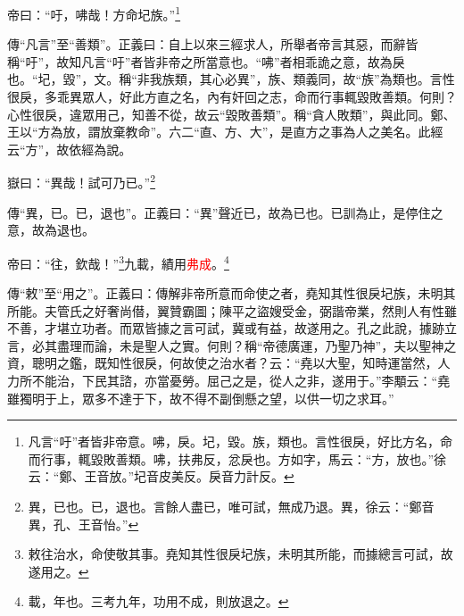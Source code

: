 帝曰：“吁，咈哉！方命圮族。”\footnote{凡言“吁”者皆非帝意。咈，戾。圮，毀。族，類也。言性很戾，好比方名，命而行事，輒毀敗善類。咈，扶弗反，忿戾也。方如字，馬云：“方，放也。”徐云：“鄭、王音放。”圮音皮美反。戾音力計反。}

{\noindent\zhuan{}\fzbyks 傳“凡言”至“善類”。正義曰：自上以來三經求人，所舉者帝言其惡，而辭皆稱“吁”，故知凡言“吁”者皆非帝之所當意也。“咈”者相乖詭之意，故為戾也。“圮，毀”，文。稱“非我族類，其心必異”，族、類義同，故“族”為類也。言性很戾，多乖異眾人，好此方直之名，內有奸回之志，命而行事輒毀敗善類。何則？心性很戾，違眾用己，知善不從，故云“毀敗善類”。稱“貪人敗類”，與此同。鄭、王以“方為放，謂放棄教命”。六二“直、方、大”，是直方之事為人之美名。此經云“方”，故依經為說。 \par}

嶽曰：“異哉！試可乃已。”\footnote{異，已也。已，退也。言餘人盡已，唯可試，無成乃退。異，徐云：“鄭音異，孔、王音怡。”}

{\noindent\zhuan{}\fzbyks 傳“異，已。已，退也”。正義曰：“異”聲近已，故為已也。已訓為止，是停住之意，故為退也。 \par}

帝曰：“往，欽哉！”\footnote{敕往治水，命使敬其事。堯知其性很戾圮族，未明其所能，而據總言可試，故遂用之。}九載，績用\textcolor{red}{弗成}。\footnote{載，年也。三考九年，功用不成，則放退之。}

{\noindent\zhuan{}\fzbyks 傳“敕”至“用之”。正義曰：傳解非帝所意而命使之者，堯知其性很戾圮族，未明其所能。夫管氏之好奢尚僣，翼贊霸圖；陳平之盜嫂受金，弼諧帝業，然則人有性雖不善，才堪立功者。而眾皆據之言可試，冀或有益，故遂用之。孔之此說，據跡立言，必其盡理而論，未是聖人之實。何則？稱“帝德廣運，乃聖乃神”，夫以聖神之資，聰明之鑑，既知性很戾，何故使之治水者？云：“堯以大聖，知時運當然，人力所不能治，下民其諮，亦當憂勞。屈己之是，從人之非，遂用于。”李顒云：“堯雖獨明于上，眾多不達于下，故不得不副倒懸之望，以供一切之求耳。” \par}

